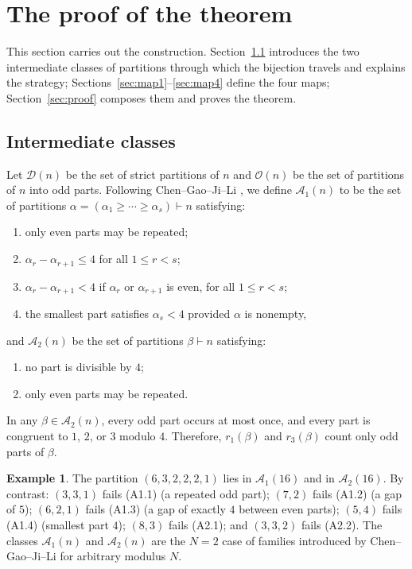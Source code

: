\documentclass[11pt]{amsart}
\theoremstyle{definition}
\newtheorem{example}[theorem]{Example}
\theoremstyle{remark}
\newcommand{\D}{\mathcal D}
\newcommand{\Oparts}{\mathcal O}
\newcommand{\Aone}{\mathcal A_1}
\newcommand{\Atwo}{\mathcal A_2}
\begin{document}
\section{The proof of the theorem}\label{sec:mainproof}

This section carries out the construction. Section~\ref{sec:classes} introduces the two intermediate classes of partitions through which the bijection travels and explains the strategy; Sections~\ref{sec:map1}--\ref{sec:map4} define the four maps; Section~\ref{sec:proof} composes them and proves the theorem.

\subsection{Intermediate classes}\label{sec:classes}
Let $\D(n)$ be the set of strict partitions of $n$ and $\Oparts(n)$ be the set of partitions of $n$ into odd parts. Following Chen--Gao--Ji--Li \cite[Section 2]{CGJL}, we define \(\Aone(n)\) to be the set of partitions \(\alpha=(\alpha_1\ge\cdots\ge\alpha_s)\vdash n\) satisfying:
\begin{enumerate}[label=\textup{(A1.\arabic*)}]
\item only even parts may be repeated;
\item \(\alpha_r-\alpha_{r+1}\le 4\) for all \(1\le r<s\);
\item \(\alpha_r-\alpha_{r+1}<4\) if $\alpha_r$ or $\alpha_{r+1}$ is even, for all \(1\le r<s\);
\item the smallest part satisfies \(\alpha_s<4\) provided \(\alpha\) is nonempty,
\end{enumerate}
and \(\Atwo(n)\) be the set of partitions \(\beta\vdash n\) satisfying:
\begin{enumerate}[label=\textup{(A2.\arabic*)}]
\item no part is divisible by \(4\);
\item only even parts may be repeated.
\end{enumerate}
In any \(\beta\in\Atwo(n)\), every odd part occurs at most once,
and every part is congruent to \(1\), \(2\), or \(3\) modulo \(4\). Therefore,
\(r_1(\beta)\) and \(r_3(\beta)\) count only odd parts of \(\beta\).

\begin{example}\label{ex:classes}
The partition $(6,3,2,2,2,1)$ lies in $\Aone(16)$ and in $\Atwo(16)$. By contrast:
$(3,3,1)$ fails \textup{(A1.1)} (a repeated odd part);
$(7,2)$ fails \textup{(A1.2)} (a gap of $5$);
$(6,2,1)$ fails \textup{(A1.3)} (a gap of exactly $4$ between even parts);
$(5,4)$ fails \textup{(A1.4)} (smallest part $4$);
$(8,3)$ fails \textup{(A2.1)}; and $(3,3,2)$ fails \textup{(A2.2)}.
The classes $\Aone(n)$ and $\Atwo(n)$ are the $N=2$ case of families introduced by Chen--Gao--Ji--Li \cite{CGJL} for arbitrary modulus $N$.
\end{example}
\end{document}
